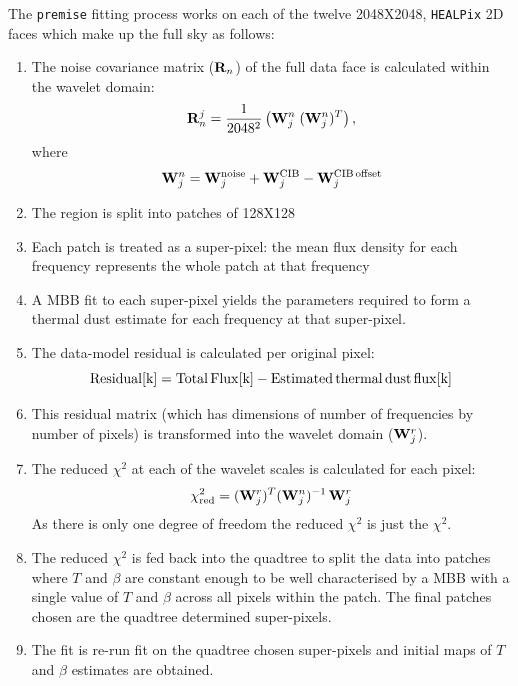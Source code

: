 \documentclass[a4paper,fleqn,usenatbib]{mnras}
\begin{document}
The {\texttt{premise}} fitting process works on each of the twelve 2048X2048, {\texttt{HEALPix}} 2D faces which make up the full sky as follows:
\begin{enumerate}[label*=\arabic*.]
\item The noise covariance matrix (${\bf{R}}_{n}$) of the full data face is calculated within the wavelet domain:
\begin{eqnarray}
{\bf{R}}_{n}^{j} = \frac{1}{2048^2} \left( {\bf{W}}_{j}^{n} \;  ({\bf{W}}_{j}^{n})^{T} \right),
\end{eqnarray} 
where 
\begin{eqnarray}
\nonumber
 {\bf{W}}_{j}^{n} =  {\bf{W}}_{j}^{\rm{noise}}  + {\bf{W}}_{j}^{\rm{CIB}} - {\bf{W}}_{j}^{\rm{CIB \, offset}} 
 \end{eqnarray} 
\item The region is split into patches of 128X128
\item Each patch is treated as a super-pixel: the mean flux density for each frequency represents the whole patch at that frequency	
\item A MBB fit to each super-pixel yields the parameters required to form a thermal dust estimate for each frequency at that super-pixel.
\item The data-model residual is calculated per original pixel:
$$
\rm{Residual}[k] = \rm{Total \, Flux}[k] -  \rm{Estimated \, thermal \, dust \, flux}[k] 
$$
\item This residual matrix (which has dimensions of number of frequencies by number of pixels) is transformed into the wavelet domain (${\bf{W}}_{j}^{r}$). 
\item The reduced $\chi^{2}$ at each of the wavelet scales is calculated for each pixel:
\begin{eqnarray}
\chi^{2}_{\rm{red}} =  ({\bf{W}}_{j}^{r})^{T}  ({\bf{W}}_{j}^{n})^{-1} \, {\bf{W}}_{j}^{r} 
\end{eqnarray}
As there is only one degree of freedom the reduced $\chi^{2}$ is just the $\chi^{2}$.
\item The reduced $\chi^{2}$ is fed back into the quadtree to split the data into patches where $T$ and $\beta$ are constant enough to be well characterised by a MBB with a single value of $T$ and $\beta$ across all pixels within the patch. The final patches chosen are the quadtree determined super-pixels.  
\item The fit is re-run fit on the quadtree chosen super-pixels and initial maps of $T$ and $\beta$ estimates are obtained.
\end{enumerate}
\end{document}
